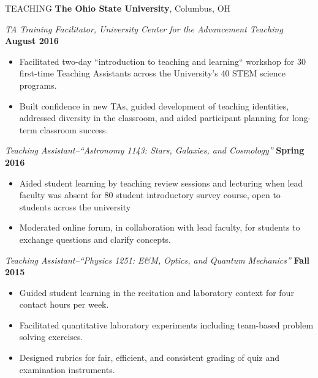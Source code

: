 \documentclass{resume} %
\begin{document}
\newpage
\begin{rSection}{TEACHING}
{\bf The Ohio State University}, Columbus, OH 

{\em TA Training Facilitator, University Center for the Advancement Teaching} \hfill {\bf August 2016}
\begin{itemize}
\vspace*{-.05in}
\item Facilitated two-day ``introduction to teaching and learning`` workshop for 30 first-time Teaching Assistants across the University's 40 STEM science programs.
\item Built confidence in new TAs, guided development of teaching identities, addressed diversity in the classroom, and aided participant planning for long-term classroom success.
\end{itemize}
{\em Teaching Assistant--``Astronomy 1143: Stars, Galaxies, and Cosmology''} \hfill {\bf Spring 2016}
\begin{itemize}
\vspace*{-.05in}
\item Aided student learning by teaching review sessions and lecturing when lead faculty was absent for 80 student introductory survey course, open to students across the university
\item Moderated online forum, in collaboration with lead faculty, for students to exchange questions and clarify concepts.
\end{itemize}
{\em Teaching Assistant--``Physics 1251: E\&M, Optics, and Quantum Mechanics''} \hfill {\bf Fall 2015}
\begin{itemize}
\vspace*{-.05in}
\item Guided student learning in the recitation and laboratory context for four contact hours per week.
\item Facilitated quantitative laboratory experiments including team-based problem solving exercises.
\item Designed rubrics for fair, efficient, and consistent grading of quiz and examination instruments.
\end{itemize}
\end{rSection}
\end{document}
